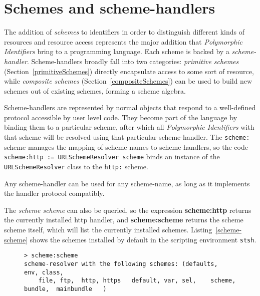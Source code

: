 \documentclass[preprint]{sigplanconf}
\begin{document}
\section{Schemes and scheme-handlers}
\label{schemes}
The addition of \emph{schemes} to identifiers in order to distinguish different kinds of resources
and resource access represents
the major addition that \emph{Polymorphic Identifiers} bring to a programming language.
Each scheme is backed by a \emph{scheme-handler}.  Scheme-handlers broadly fall into two categories:
 \emph{primitive schemes} (Section~\ref{primitiveSchemes})
directly encapsulate access to some sort of resource, while \emph{composite schemes} (Section~\ref{compositeSchemes})
can be used to build new schemes out of existing schemes, forming a scheme algebra.

\sloppy   %

Scheme-handlers are represented by normal objects that respond to a well-defined protocol 
accessible by user level code.  They
become part of the language by binding them to a particular scheme, after which
all \emph{Polymorphic Identifiers} with that scheme will be resolved using that particular scheme-handler.
The {\tt scheme:} scheme manages the mapping of scheme-names to scheme-handlers, so the code 
{\tt scheme:http := URLSchemeResolver scheme} binds an instance of the {\tt URLSchemeResolver} class
to the {\tt http:} scheme.

\fussy

 Any scheme-handler
can be used for any scheme-name, as long as it implements the handler protocol
compatibly.


The \emph{scheme scheme} can also be queried,
so the expression {\bf scheme:http} returns the currently installed http handler, and 
{\bf scheme:scheme} returns the scheme scheme itself, which will list the currently
installed schemes.  Listing~\ref{scheme-scheme} shows the schemes installed by
default in the scripting environment {\tt stsh}.

\vspace{-0.5em}
\begin{figure}[htbp]
\begin{lstlisting}[style=numbers,label=scheme-scheme,caption=List of schemes via scheme:scheme.]
> scheme:scheme 
scheme-resolver with the following schemes: (defaults,  env, class,
    file, ftp,  http, https   default, var, sel,    scheme,    bundle,  mainbundle   )
\end{lstlisting}
\end{figure}
\vspace{-0.5em}
\end{document}
